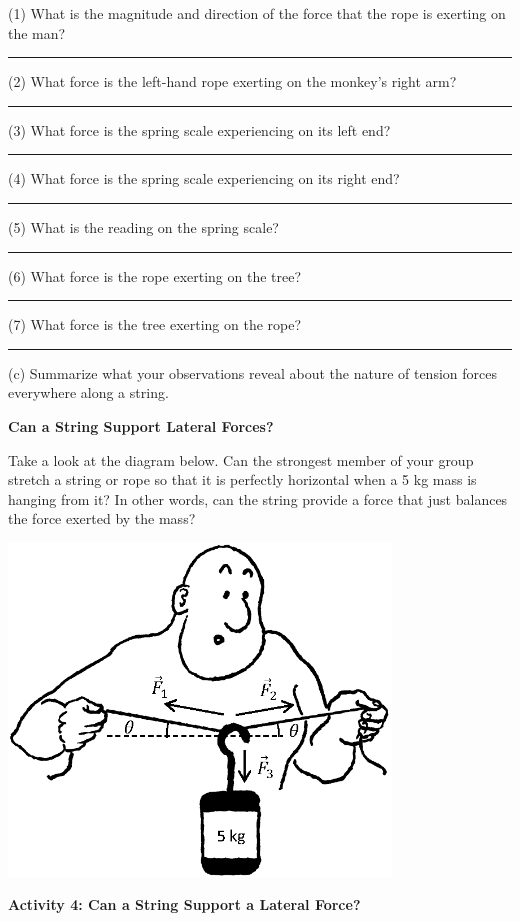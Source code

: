 (1) What is the magnitude and direction of the force that the rope is exerting
on the man? \rule{1.0in}{0.1pt}

(2) What force is the left-hand rope exerting on the monkey's right arm? \rule{1.0in}{0.1pt}

(3) What force is the spring scale experiencing on its left end? \rule{1.0in}{0.1pt}

(4) What force is the spring scale experiencing on its right end? \rule{1.0in}{0.1pt}

(5) What is the reading on the spring scale? \rule{1.0in}{0.1pt}

(6) What force is the rope exerting on the tree? \rule{1.0in}{0.1pt}

(7) What force is the tree exerting on the rope? \rule{1.0in}{0.1pt}

(c) Summarize what your observations reveal about the nature of tension forces
everywhere along a string.
\answerspace{15mm}

\textbf{Can a String Support Lateral Forces? }

Take a look at the diagram below. Can the strongest member of your group stretch
a string or rope so that it is perfectly horizontal when a 5 kg mass is hanging
from it? In other words, can the string provide a force that just balances the
force exerted by the mass?

{\par\centering \includegraphics[width=4in]{newton/newton_fig7_new.eps} \par}

\pagebreak[2]
\textbf{Activity 4: Can a String Support a Lateral Force?} 


